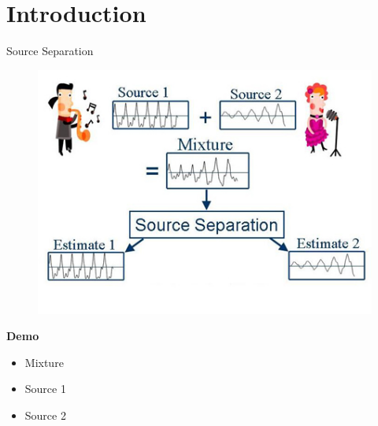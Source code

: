 \documentclass[xcolor=table,mathserif,9pt]{beamer}    %
\begin{document}
\section{Introduction}%
\label{sec:introduction}
\begin{frame}{Source Separation}

\begin{center}
	\begin{figure}
	\includegraphics[width=.6\textwidth]{images/separation_example.jpg}
	\end{figure}
\end{center}

\textbf{Demo} \cite{Demo}
\begin{itemize}
	\item Mixture
	\item Source 1 
	\item Source 2 
\end{itemize}


\end{frame}
\end{document}
